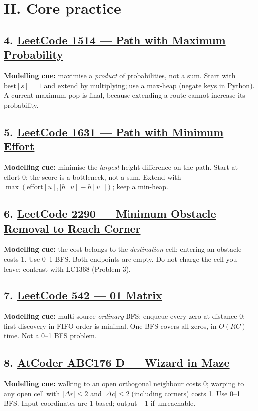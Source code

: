 \documentclass[12pt]{article}
\begin{document}
\section*{II. Core practice}

\subsection*{4. \href{https://leetcode.com/problems/path-with-maximum-probability/}{LeetCode 1514 --- Path with Maximum Probability}}
\textbf{Modelling cue:} maximise a \emph{product} of probabilities, not a sum. Start with $\mathrm{best}[s]=1$ and extend by multiplying; use a max-heap (negate keys in Python). A current maximum pop is final, because extending a route cannot increase its probability.

\subsection*{5. \href{https://leetcode.com/problems/path-with-minimum-effort/}{LeetCode 1631 --- Path with Minimum Effort}}
\textbf{Modelling cue:} minimise the \emph{largest} height difference on the path. Start at effort 0; the score is a bottleneck, not a sum. Extend with $\max(\mathrm{effort}[u], |h[u]-h[v]|)$; keep a min-heap.

\subsection*{6. \href{https://leetcode.com/problems/minimum-obstacle-removal-to-reach-corner/}{LeetCode 2290 --- Minimum Obstacle Removal to Reach Corner}}
\textbf{Modelling cue:} the cost belongs to the \emph{destination} cell: entering an obstacle costs 1. Use 0--1 BFS. Both endpoints are empty. Do not charge the cell you leave; contrast with LC1368 (Problem 3).

\subsection*{7. \href{https://leetcode.com/problems/01-matrix/}{LeetCode 542 --- 01 Matrix}}
\textbf{Modelling cue:} multi-source \emph{ordinary} BFS: enqueue every zero at distance 0; first discovery in FIFO order is minimal. One BFS covers all zeros, in $O(RC)$ time. Not a 0--1 BFS problem.

\subsection*{8. \href{https://atcoder.jp/contests/abc176/tasks/abc176_d}{AtCoder ABC176 D --- Wizard in Maze}}
\textbf{Modelling cue:} walking to an open orthogonal neighbour costs 0; warping to any open cell with $|\Delta r|\le2$ and $|\Delta c|\le2$ (including corners) costs 1. Use 0--1 BFS. Input coordinates are 1-based; output $-1$ if unreachable.
\end{document}
